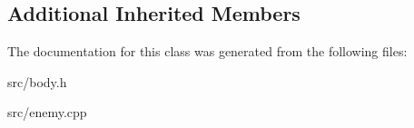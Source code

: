 \subsection*{Additional Inherited Members}


The documentation for this class was generated from the following files\+:\begin{DoxyCompactItemize}
\item 
src/body.\+h\item 
src/enemy.\+cpp\end{DoxyCompactItemize}
